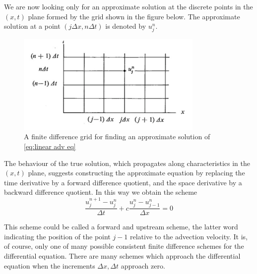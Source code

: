 We are now looking only for an approximate solution at the discrete points in the $(x,t)$ plane formed by the grid shown in the figure below. The approximate solution at a point $(j\Delta x,n\Delta t)$ is denoted by $u^n_j$.
\begin{figure}[h]
	\centering
	\includegraphics[width=9cm]{uploads/image.png}
	\caption{A finite difference grid for finding an approximate solution of \ref{eq:linear adv eq}}
	\label{fig:grid sol lin adv eq}
\end{figure}
The behaviour of the true solution, which propagates along characteristics in the $(x,t)$ plane, suggests constructing the approximate equation by replacing the time derivative by a forward difference quotient, and the space derivative by a backward difference quotient. In this way we obtain the scheme
\begin{equation}\label{eq:forward and upward scheme}
	\frac{u_j^{n+1}-u_j^n}{\Delta t}+c\frac{u_j^n-u^n_{j-1}}{\Delta x}=0
\end{equation}

This scheme could be called a forward and upstream scheme, the latter word indicating the position of the point $j-1$ relative to the advection velocity. It is, of course, only one of many possible consistent finite difference schemes for the differential equation. There are many schemes which approach the differential equation when the increments $\Delta x,\Delta t$ approach zero.

